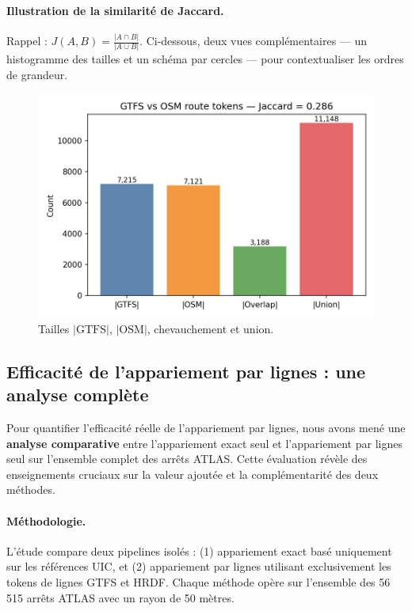 \paragraph{Illustration de la similarité de Jaccard.} Rappel : \(J(A,B) = \frac{|A \cap B|}{|A \cup B|}\). Ci-dessous, deux vues complémentaires — un histogramme des tailles et un schéma par cercles — pour contextualiser les ordres de grandeur.

\begin{figure}[H]
  \centering
  \includegraphics[width=\textwidth]{../figures/chap4/jaccard_sets_bars.png}
  \caption*{Tailles \(|\mathrm{GTFS}|\), \(|\mathrm{OSM}|\), chevauchement et union.}
\end{figure}

\subsection{Efficacité de l'appariement par lignes : une analyse complète}
Pour quantifier l'efficacité réelle de l'appariement par lignes, nous avons mené une \textbf{analyse comparative} entre l'appariement exact seul et l'appariement par lignes seul sur l'ensemble complet des arrêts ATLAS. Cette évaluation révèle des enseignements cruciaux sur la valeur ajoutée et la complémentarité des deux méthodes.

\paragraph{Méthodologie.} L'étude compare deux pipelines isolés : (1) appariement exact basé uniquement sur les références UIC, et (2) appariement par lignes utilisant exclusivement les tokens de lignes GTFS et HRDF. Chaque méthode opère sur l'ensemble des 56\,515 arrêts ATLAS avec un rayon de 50 mètres.

